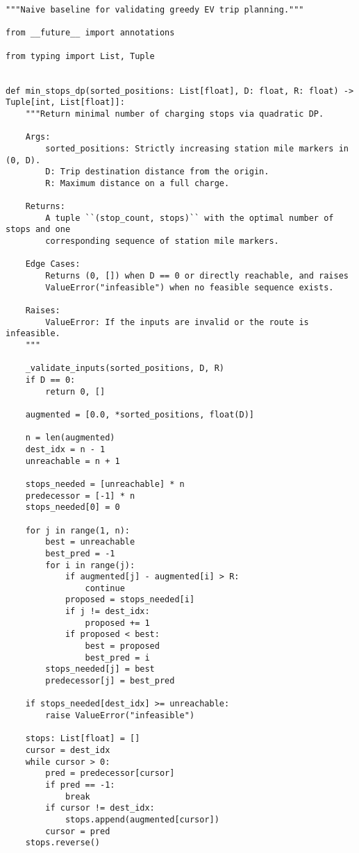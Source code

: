 \begin{lstlisting}[caption={Dynamic programming baseline for validation},label={lst:ev-naive}]
"""Naive baseline for validating greedy EV trip planning."""

from __future__ import annotations

from typing import List, Tuple


def min_stops_dp(sorted_positions: List[float], D: float, R: float) -> Tuple[int, List[float]]:
    """Return minimal number of charging stops via quadratic DP.

    Args:
        sorted_positions: Strictly increasing station mile markers in (0, D).
        D: Trip destination distance from the origin.
        R: Maximum distance on a full charge.

    Returns:
        A tuple ``(stop_count, stops)`` with the optimal number of stops and one
        corresponding sequence of station mile markers.

    Edge Cases:
        Returns (0, []) when D == 0 or directly reachable, and raises
        ValueError("infeasible") when no feasible sequence exists.

    Raises:
        ValueError: If the inputs are invalid or the route is infeasible.
    """

    _validate_inputs(sorted_positions, D, R)
    if D == 0:
        return 0, []

    augmented = [0.0, *sorted_positions, float(D)]

    n = len(augmented)
    dest_idx = n - 1
    unreachable = n + 1

    stops_needed = [unreachable] * n
    predecessor = [-1] * n
    stops_needed[0] = 0

    for j in range(1, n):
        best = unreachable
        best_pred = -1
        for i in range(j):
            if augmented[j] - augmented[i] > R:
                continue
            proposed = stops_needed[i]
            if j != dest_idx:
                proposed += 1
            if proposed < best:
                best = proposed
                best_pred = i
        stops_needed[j] = best
        predecessor[j] = best_pred

    if stops_needed[dest_idx] >= unreachable:
        raise ValueError("infeasible")

    stops: List[float] = []
    cursor = dest_idx
    while cursor > 0:
        pred = predecessor[cursor]
        if pred == -1:
            break
        if cursor != dest_idx:
            stops.append(augmented[cursor])
        cursor = pred
    stops.reverse()


\end{lstlisting}
